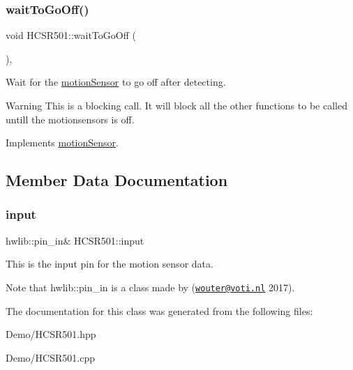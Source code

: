 \subsubsection{\texorpdfstring{wait\+To\+Go\+Off()}{waitToGoOff()}}
{\footnotesize\ttfamily void H\+C\+S\+R501\+::wait\+To\+Go\+Off (\begin{DoxyParamCaption}{ }\end{DoxyParamCaption})\hspace{0.3cm}{\ttfamily [override]}, {\ttfamily [virtual]}}



Wait for the \mbox{\hyperlink{classmotion_sensor}{motion\+Sensor}} to go off after detecting. 

\begin{DoxyWarning}{Warning}
This is a blocking call. It will block all the other functions to be called untill the motionsensors is off. 
\end{DoxyWarning}


Implements \mbox{\hyperlink{classmotion_sensor_a855b7f86c8ef833bbcd2064a220a4b58}{motion\+Sensor}}.



\subsection{Member Data Documentation}
\mbox{\label{class_h_c_s_r501_a00d41bcf68fa634e07ae68488d2b61ee}} 
\subsubsection{\texorpdfstring{input}{input}}
{\footnotesize\ttfamily hwlib\+::pin\+\_\+in\& H\+C\+S\+R501\+::input\hspace{0.3cm}{\ttfamily [private]}}



This is the input pin for the motion sensor data. 

Note that hwlib\+::pin\+\_\+in is a class made by (\href{mailto:wouter@voti.nl}{\tt wouter@voti.\+nl} 2017). 

The documentation for this class was generated from the following files\+:\begin{DoxyCompactItemize}
\item 
Demo/H\+C\+S\+R501.\+hpp\item 
Demo/H\+C\+S\+R501.\+cpp\end{DoxyCompactItemize}
